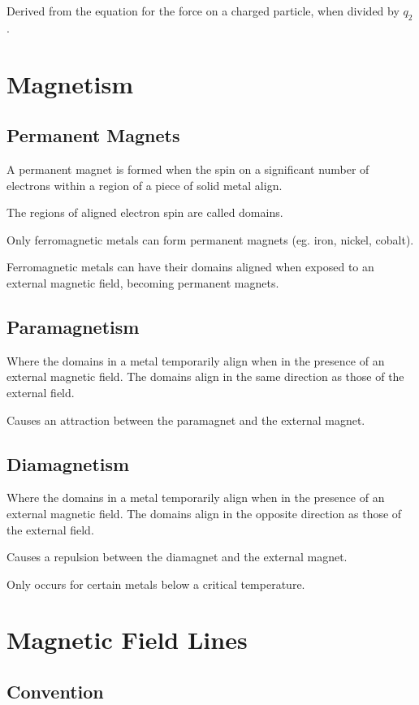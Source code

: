 \documentclass[a4paper,11pt]{report}
\begin{document}
Derived from the equation for the force on a charged particle, when divided by
$q_2$.


\section{Magnetism}

\subsection{Permanent Magnets}

A permanent magnet is formed when the spin on a significant number of
electrons within a region of a piece of solid metal align.

The regions of aligned electron spin are called domains.

Only ferromagnetic metals can form permanent magnets (eg. iron, nickel,
cobalt).

Ferromagnetic metals can have their domains aligned when exposed to an external
magnetic field, becoming permanent magnets.

\subsection{Paramagnetism}

Where the domains in a metal temporarily align when in the presence of an
external magnetic field.
The domains align in the same direction as those of the external field.

Causes an attraction between the paramagnet and the external magnet.

\subsection{Diamagnetism}

Where the domains in a metal temporarily align when in the presence of an
external magnetic field.
The domains align in the opposite direction as those of the external field.

Causes a repulsion between the diamagnet and the external magnet.

Only occurs for certain metals below a critical temperature.


\section{Magnetic Field Lines}

\subsection{Convention}
\end{document}
